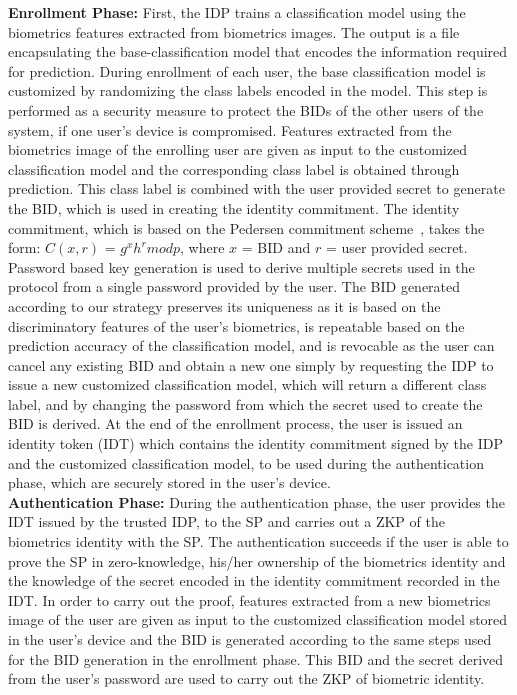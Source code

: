 \documentclass[10pt]{article}
\begin{document}
\textbf{Enrollment Phase:}
First, the IDP trains a classification model using the biometrics features extracted from biometrics images. The output is a 
file encapsulating the base-classification model that encodes the information required for prediction. 
During enrollment of each user, the base classification model is customized by randomizing the class labels encoded in the 
model. This step is performed as a security measure to protect the BIDs of the other users of the system, if one user's device is compromised.
Features extracted from the biometrics image of the enrolling user are given as input to the customized classification model and the corresponding 
class label is obtained through prediction. This class label is combined with the user provided secret to generate the BID, which is used in creating 
the identity commitment. The identity commitment, which is based on the Pedersen commitment scheme~\cite{pedersenCommitment}, takes the form: $C (x, 
r)$ = $g^{x}h^{r} mod p$, where $x$ = BID and $r$ = user provided secret. Password based key generation is used to derive multiple secrets used in 
the protocol from a single password provided by the user. The BID generated according to our strategy preserves its uniqueness as it is based on the 
discriminatory features of the user's biometrics, is repeatable based on the prediction accuracy of the classification model, and is revocable as the 
user can cancel any existing BID and obtain a new one simply by requesting the IDP to issue a new customized classification model, which will return 
a different class label, and by changing the password from which the secret used to create the BID is derived.
At the end of the enrollment process, the user is issued an identity token (IDT) which contains the identity commitment signed by the IDP and the 
customized classification model, to be used during the authentication phase, which are securely stored in the user's device.\\

\textbf{Authentication Phase:}
During the authentication phase, the user provides the IDT issued by the trusted IDP, to the SP and carries out a ZKP of the biometrics identity with 
the SP.
The authentication succeeds if the user is able to prove the SP in zero-knowledge, his/her ownership of the biometrics identity and the knowledge of 
the secret encoded in the identity commitment recorded in the IDT. In order to carry out the proof, features extracted from a new biometrics image of the user 
are given as input to the customized classification model stored in the user's device and the BID is generated according to the same steps used for the BID generation in the 
enrollment phase. This BID and the secret derived from the user's password are used to carry out the ZKP of biometric identity.\\
\end{document}
